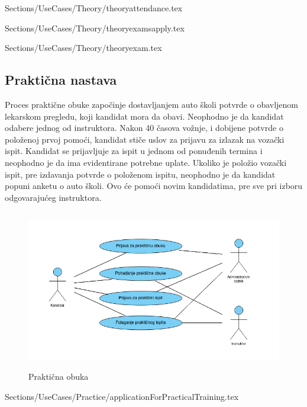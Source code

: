  {Sections/UseCases/Theory/theoryattendance.tex}

 {Sections/UseCases/Theory/theoryexamsapply.tex}

 {Sections/UseCases/Theory/theoryexam.tex}

\subsection {Praktična nastava}
Proces praktične obuke započinje dostavljanjem auto školi potvrde o obavljenom lekarskom pregledu, koji kandidat mora da obavi. Neophodno je da kandidat odabere jednog od instruktora. Nakon 40 časova vožnje, i dobijene potvrde o položenoj prvoj pomoći, kandidat stiče uslov za prijavu za izlazak na vozački ispit. Kandidat se prijavljuje za ispit u jednom od ponuđenih termina i neophodno je da ima evidentirane potrebne uplate. Ukoliko je položio vozački ispit, pre izdavanja potvrde o položenom ispitu, neophodno je da kandidat popuni anketu o auto školi. Ovo će pomoći novim kandidatima, pre sve pri izboru odgovarajućeg instruktora.


\begin{figure}[H]
    \begin{center}
        \includegraphics[width=170mm, height=70mm]{Diagrams/prakticna_obuka.png}
    \end{center}
    \caption {Praktična obuka}
    \label{usecase_praktična obuka}

\end{figure}

 {Sections/UseCases/Practice/applicationForPracticalTraining.tex}







